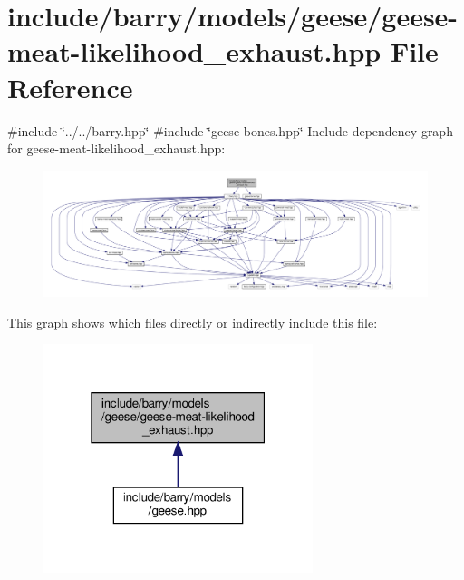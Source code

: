 \hypertarget{geese-meat-likelihood__exhaust_8hpp}{}\section{include/barry/models/geese/geese-\/meat-\/likelihood\+\_\+exhaust.hpp File Reference}
\label{geese-meat-likelihood__exhaust_8hpp}
{\ttfamily \#include \char`\"{}../../barry.\+hpp\char`\"{}}\newline
{\ttfamily \#include \char`\"{}geese-\/bones.\+hpp\char`\"{}}\newline
Include dependency graph for geese-\/meat-\/likelihood\+\_\+exhaust.hpp\+:\nopagebreak
\begin{figure}[H]
\begin{center}
\leavevmode
\includegraphics[width=350pt]{geese-meat-likelihood__exhaust_8hpp__incl}
\end{center}
\end{figure}
This graph shows which files directly or indirectly include this file\+:\nopagebreak
\begin{figure}[H]
\begin{center}
\leavevmode
\includegraphics[width=223pt]{geese-meat-likelihood__exhaust_8hpp__dep__incl}
\end{center}
\end{figure}
